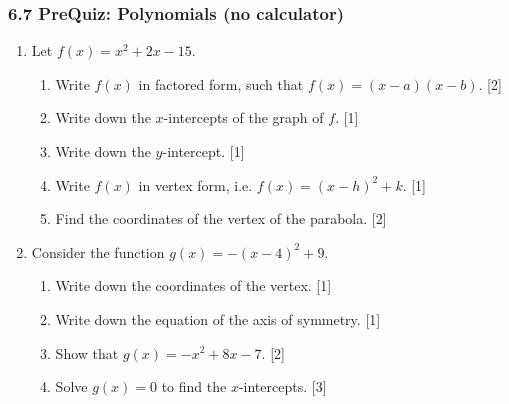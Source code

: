 \documentclass[12pt, twoside]{article}
\begin{document}
\subsubsection*{6.7 PreQuiz: Polynomials (no calculator)}

\begin{enumerate}[itemsep=0.15cm]

\item[1.] [Maximum mark: 7]

Let $f(x) = x^2 + 2x - 15$.

\begin{enumerate}[itemsep=0.15cm]
  \item Write $f(x)$ in factored form, such that $f(x) = (x - a)(x - b)$. \hfill [2]
  \item Write down the $x$-intercepts of the graph of $f$. \hfill [1]
  \item Write down the $y$-intercept. \hfill [1]
  \item Write $f(x)$ in vertex form, i.e. $f(x) = (x - h)^2 + k$. \hfill [1]
  \item Find the coordinates of the vertex of the parabola. \hfill [2]
\end{enumerate}


\newpage

\item[2.] [Maximum mark: 7]

Consider the function $g(x) = -(x - 4)^2 + 9$.

\begin{enumerate}[itemsep=0.15cm]
  \item Write down the coordinates of the vertex. \hfill [1]
  \item Write down the equation of the axis of symmetry. \hfill [1]
  \item Show that $g(x) = -x^2 + 8x - 7$. \hfill [2]
  \item Solve $g(x) = 0$ to find the $x$-intercepts. \hfill [3]
\end{enumerate}



\end{enumerate}
\end{document}

